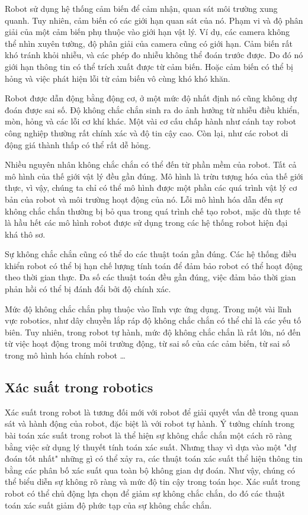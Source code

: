 Robot sử dụng hệ thống cảm biến để cảm nhận, quan sát môi trường xung quanh. Tuy nhiên, cảm biến có các giới hạn quan sát của nó. Phạm vi và độ phân giải của một cảm biến phụ thuộc vào giới hạn vật lý. Ví dụ, các camera không thể nhìn xuyên tường, độ phân giải của camera cũng có giới hạn. Cảm biến rất khó tránh khỏi nhiễu, và các phép đo nhiễu không thể đoán trước được. Do đó nó giới hạn thông tin có thể trích xuất được từ cảm biến. Hoặc cảm biến có thể bị hỏng và việc phát hiện lỗi từ cảm biến vô cùng khó khó khăn.

Robot được dẫn động bằng động cơ, ở một mức độ nhất định nó cũng không dự đoán được sai số. Độ không chắc chắn sinh ra do ảnh hưởng từ nhiễu điều khiển, mòn, hỏng và các lỗi cơ khí khác. Một vài cơ cấu chấp hành như cánh tay robot công nghiệp thường rất chính xác và độ tin cậy cao. Còn lại, như các robot di động giá thành thấp có thể rất dễ hỏng.

Nhiều nguyên nhân không chắc chắn có thể đến từ phần mềm của robot. Tất cả mô hình của thế giới vật lý đều gần đúng. Mô hình là trừu tượng hóa của thế giới thực, vì vậy, chúng ta chỉ có thể mô hình được một phần các quá trình vật lý cơ bản của robot và môi trường hoạt động của nó. Lỗi mô hình hóa dẫn đến sự không chắc chắn thường bị bỏ qua trong quá trình chế tạo robot, mặc dù thực tế là hầu hết các mô hình robot được sử dụng trong các hệ thống robot hiện đại khá thô sơ.

Sự không chắc chắn cũng có thể do các thuật toán gần đúng. Các hệ thống điều khiển robot có thể bị hạn chế lượng tính toán để đảm bảo robot có thể hoạt động theo thời gian thực. Đa số các thuật toán đều gần đúng, việc đảm bảo thời gian phản hồi có thể bị đánh đổi bởi độ chính xác.

Mức độ không chắc chắn phụ thuộc vào lĩnh vực ứng dụng. Trong một vài lĩnh vực robotics, như dây chuyền lắp ráp độ không chắc chắn có thể chỉ là các yếu tố biên. Tuy nhiên, trong robot tự hành, mức độ không chắc chắn là rất lớn, nó đến từ việc hoạt động trong môi trường động, từ sai số của các cảm biến, từ sai số trong mô hình hóa chính robot \dots

\subsection{Xác suất trong robotics}

Xác suất trong robot là tương đối mới với robot để giải quyết vấn đề trong quan sát và hành động của robot, đặc biệt là với robot tự hành. Ý tưởng chính trong bài toán xác suất trong robot là thể hiện sự không chắc chắn một cách rõ ràng bằng việc sử dụng lý thuyết tính toán xác suất. Nhưng thay vì dựa vào một "dự đoán tốt nhất" những gì có thể xảy ra, các thuật toán xác suất thể hiện thông tin bằng các phân bố xác suất qua toàn bộ không gian dự đoán. Như vậy, chúng có thể biểu diễn sự không rõ ràng và mức độ tin cậy trong toán học. Xác suất trong robot có thể chủ động lựa chọn để giảm sự không chắc chắn, do đó các thuật toán xác suất giảm độ phức tạp của sự không chắc chắn.

